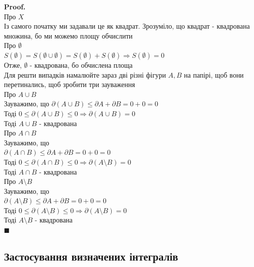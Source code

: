 \documentclass[a4paper, 14pt]{extarticle}
\def\bigline{\vspace{5mm}\\}
\theoremstyle{theoremdd}
\theoremstyle{theoremdd}
\theoremstyle{theoremdd}
\theoremstyle{theoremdd}
\theoremstyle{theoremdd}
\theoremstyle{theoremdd}
\theoremstyle{theoremdd}
\theoremstyle{theoremdd}
\newenvironment{pf}{\vspace*{-3mm} \textbf{Proof. \\}}{$\blacksquare$}
\begin{document}
\begin{pf}
Про $X$\\
Із самого початку ми задавали це як квадрат. Зрозуміло, що квадрат - квадрована множина, бо ми можемо площу обчислити
\bigline
Про $\emptyset$\\
$S(\emptyset) = S(\emptyset \cup \emptyset) = S(\emptyset) + S(\emptyset) \Rightarrow S(\emptyset) = 0$\\
Отже, $\emptyset$ - квадрована, бо обчислена площа
\bigline
Для решти випадків намалюйте зараз дві різні фігури $A,B$ на папірі, щоб вони перетинались, щоб зробити три зауваження\\
Про $A \cup B$\\
Зауважимо, що
$\partial (A \cup B) \leq \partial A + \partial B = 0 + 0 = 0$\\
Тоді $0 \leq \partial (A \cup B) \leq 0 \Rightarrow \partial (A \cup B) = 0$\\
Тоді $A \cup B$ - квадрована
\bigline
Про $A \cap B$\\
Зауважимо, що\\
$\partial (A \cap B) \leq \partial A + \partial B = 0 + 0 = 0$\\
Тоді $0 \leq \partial (A \cap B) \leq 0 \Rightarrow \partial (A \setminus B) = 0$\\
Тоді $A \cap B$ - квадрована
\bigline
Про $A \setminus B$\\
Зауважимо, що\\
$\partial (A \setminus B) \leq \partial A + \partial B = 0 + 0 = 0$\\
Тоді $0 \leq \partial (A \setminus B) \leq 0 \Rightarrow \partial (A \setminus B) = 0$\\
Тоді $A \setminus B$ - квадрована\\
\end{pf}

\subsection{Застосування визначених інтегралів}
\end{document}
